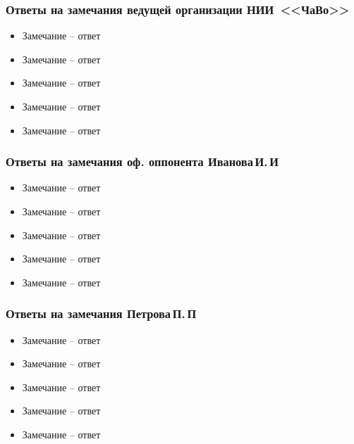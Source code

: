 \begin{frame}
    \frametitle{Ответы на замечания ведущей организации НИИ~<<ЧаВо>>}
    \begin{itemize}
        \item Замечание -- ответ
        \item Замечание -- ответ
        \item Замечание -- ответ
        \item Замечание -- ответ
        \item Замечание -- ответ
    \end{itemize}
\end{frame}

\begin{frame}
    \frametitle{Ответы на замечания оф. оппонента Иванова\,И.\,И}
    \begin{itemize}
        \item Замечание -- ответ
        \item Замечание -- ответ
        \item Замечание -- ответ
        \item Замечание -- ответ
        \item Замечание -- ответ
    \end{itemize}
\end{frame}

\begin{frame}
    \frametitle{Ответы на замечания Петрова\,П.\,П}
    \begin{itemize}
        \item Замечание -- ответ
        \item Замечание -- ответ
        \item Замечание -- ответ
        \item Замечание -- ответ
        \item Замечание -- ответ
    \end{itemize}
\end{frame}

